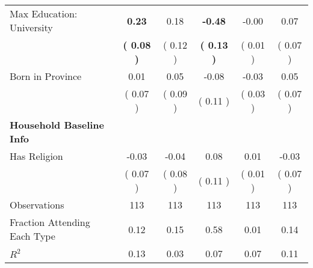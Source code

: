 \begin{table}[H]
{\begin{tabular}{lccccc}
\quad Max Education: University & \textbf{     0.23} &      0.18 & \textbf{    -0.48} &     -0.00 &      0.07 \\
\quad  & \textbf{(     0.08 )} & (     0.12 )  & \textbf{(     0.13 )}  & (     0.01 ) & (     0.07 ) \\
\quad Born in Province &      0.01 &      0.05 &     -0.08 &     -0.03 &      0.05 \\
\quad  & (     0.07 ) & (     0.09 )  & (     0.11 )  & (     0.03 ) & (     0.07 ) \\
\midrule
\textbf{Household Baseline Info} \\
\quad Has Religion &     -0.03 &     -0.04 &      0.08 &      0.01 &     -0.03 \\
\quad  & (     0.07 ) & (     0.08 )  & (     0.11 )  & (     0.01 ) & (     0.07 ) \\
\midrule
Observations & 113 & 113 & 113 & 113 & 113 \\
Fraction Attending Each Type &      0.12 &      0.15 &      0.58 &      0.01 &      0.14 \\
\midrule
$ R^2$ &      0.13 &      0.03 &      0.07 &      0.07 &      0.11 \\
\bottomrule
\end{tabular}}
\end{table}
